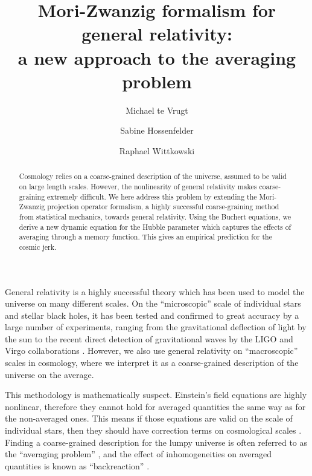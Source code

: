 \documentclass[aps,prl,twocolumn,10pt,superscriptaddress,nofootinbib,balancelastpage]{revtex4-1}
\newcommand{\ZT}[1]{\textquotedblleft#1\textquotedblright}%
\begin{document}
\title{Mori-Zwanzig formalism for general relativity:\\a new approach to the averaging problem}


\author{Michael te Vrugt}

\author{Sabine Hossenfelder}

\author{Raphael Wittkowski}


\begin{abstract}
Cosmology relies on a coarse-grained description of the universe, assumed to be valid on large length scales. However, the nonlinearity of general relativity makes coarse-graining extremely difficult. We here address this problem by extending the Mori-Zwanzig projection operator formalism, a highly successful coarse-graining method from statistical mechanics, towards general relativity. Using the Buchert equations, we derive a new dynamic equation for the Hubble parameter which captures the effects of averaging through a memory function. This gives an empirical prediction for the cosmic jerk.
\end{abstract}
\maketitle

General relativity \cite{Einstein1914,Einstein1915b,Einstein1916} is a highly successful theory which has been used to model the universe on many different scales. On the \ZT{microscopic} scale of individual stars and stellar black holes, it has been tested and confirmed to great accuracy by a large number of experiments, ranging from the gravitational deflection of light by the sun \cite{DysonED1920} to the recent direct detection of gravitational waves by the LIGO and Virgo collaborations \cite{Abbott2016,Abbott2016b}. However, we also use general relativity on \ZT{macroscopic} scales in cosmology, where we interpret it as a coarse-grained description of the universe on the average. 

This methodology is mathematically suspect. Einstein's field equations are highly nonlinear, therefore they cannot hold for averaged quantities the same way as for the non-averaged ones. This means if those equations are valid on the scale of individual stars, then they should have correction terms on cosmological scales \cite{ClarksonELU2011}. Finding a coarse-grained description for the lumpy universe is often referred to as the \ZT{averaging problem} \cite{ClarksonELU2011,Wiltshire2007,Wiltshire2011,Zalaletdinov2008,Ginat2021,Paranjape2009,Buchert2011}, and the effect of inhomogeneities on averaged quantities is known as \ZT{backreaction} \cite{ClarksonELU2011,Rasanen2011}.
 
\end{document}
